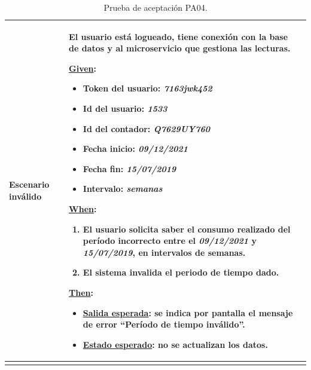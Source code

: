 \documentclass[pdftex,11pt,a4paper]{book}
\begin{document}
\begin{center}
\begin{longtable}{|>{\centering\arraybackslash}X m{2cm}|m{12cm}|}
\\ \hline
\textbf{Escenario inválido} & {\raggedright El usuario está logueado, tiene conexión con la base de datos y al microservicio que gestiona las lecturas.\par}
\vspace{2mm}
\break

\underline{Given}:
\vspace{-3mm}
\begin{itemize}
\addtolength{\itemsep}{-3mm}
\item Token del usuario: \textit{7163jwk452}
\item Id del usuario: \textit{1533}
\item Id del contador: \textit{Q7629UY760}
\item Fecha inicio: \textit{09/12/2021}
\item Fecha fin: \textit{15/07/2019}
\item Intervalo: \textit{semanas}

\end{itemize}

\underline{When}:
\begin{enumerate}
\vspace{-3mm}
\addtolength{\itemsep}{-3mm}
\item El usuario solicita saber el consumo realizado del período incorrecto entre el \textit{09/12/2021} y \textit{15/07/2019}, en intervalos de semanas.
\item El sistema invalida el periodo de tiempo dado.

\end{enumerate}
\break

\underline{Then}:
\vspace{-3mm}
\begin{itemize}
\addtolength{\itemsep}{-3mm}
\item \underline{Salida esperada}: se indica por pantalla el mensaje de error “Período de tiempo inválido”.
\item \underline{Estado esperado}: no se actualizan los datos.
\end{itemize}
\\ \hline

\caption{Prueba de aceptación PA04.} \label{tablalarga:tablaPA04}
\end{longtable}
\end{center}

\newpage
\end{document}

